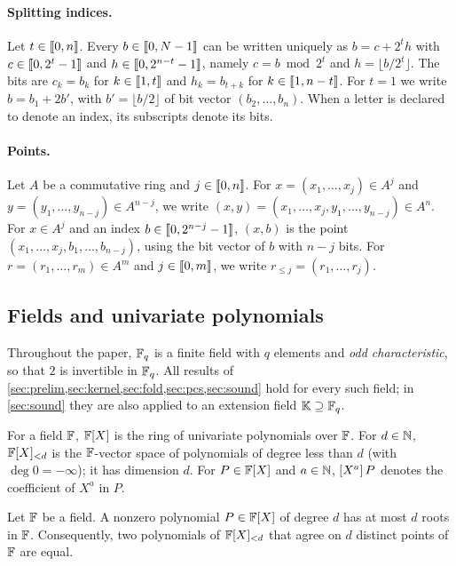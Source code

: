 \paragraph{Splitting indices.}
Let $t \in \llbracket 0, n \rrbracket$. Every $b \in \llbracket 0, N-1 \rrbracket$ can be written uniquely as $b = c + 2^t h$ with $c \in \llbracket 0, 2^t-1 \rrbracket$ and $h \in \llbracket 0, 2^{n-t}-1 \rrbracket$, namely $c = b \bmod 2^t$ and $h = \lfloor b/2^t \rfloor$.
The bits are $c_k = b_k$ for $k \in \llbracket 1, t \rrbracket$ and $h_k = b_{t+k}$ for $k \in \llbracket 1, n-t \rrbracket$.
For $t = 1$ we write $b = b_1 + 2b'$, with $b' = \lfloor b/2 \rfloor$ of bit vector $(b_2,\dots,b_n)$.
When a letter is declared to denote an index, its subscripts denote its bits.

\paragraph{Points.}
Let $A$ be a commutative ring and $j \in \llbracket 0, n \rrbracket$.
For $x = (x_1,\dots,x_j) \in A^j$ and $y = (y_1,\dots,y_{n-j}) \in A^{n-j}$, we write $(x,y) = (x_1,\dots,x_j,y_1,\dots,y_{n-j}) \in A^n$.
For $x \in A^j$ and an index $b \in \llbracket 0, 2^{n-j}-1 \rrbracket$, $(x, b)$ is the point $(x_1,\dots,x_j,b_1,\dots,b_{n-j})$, using the bit vector of $b$ with $n-j$ bits.
For $r = (r_1,\dots,r_m) \in A^m$ and $j \in \llbracket 0, m \rrbracket$, we write $r_{\le j} = (r_1,\dots,r_j)$.

\subsection{Fields and univariate polynomials}\label{sec:prelim:fields}

Throughout the paper, $\mathbb{F}_q$ is a finite field with $q$ elements and \emph{odd characteristic}, so that $2$ is invertible in $\mathbb{F}_q$.
All results of \cref{sec:prelim,sec:kernel,sec:fold,sec:pcs,sec:sound} hold for every such field; in \cref{sec:sound} they are also applied to an extension field $\mathbb{K} \supseteq \mathbb{F}_q$.

For a field $\mathbb{F}$, $\mathbb{F}[X]$ is the ring of univariate polynomials over $\mathbb{F}$.
For $d \in \mathbb{N}$, $\mathbb{F}[X]_{<d}$ is the $\mathbb{F}$-vector space of polynomials of degree less than $d$ (with $\deg 0 = -\infty$); it has dimension $d$.
For $P \in \mathbb{F}[X]$ and $a \in \mathbb{N}$, $[X^{a}]\,P$ denotes the coefficient of $X^a$ in $P$.

\begin{lemma}\label{lem:roots}
Let $\mathbb{F}$ be a field. A nonzero polynomial $P \in \mathbb{F}[X]$ of degree $d$ has at most $d$ roots in $\mathbb{F}$.
Consequently, two polynomials of $\mathbb{F}[X]_{<d}$ that agree on $d$ distinct points of $\mathbb{F}$ are equal.
\end{lemma}

